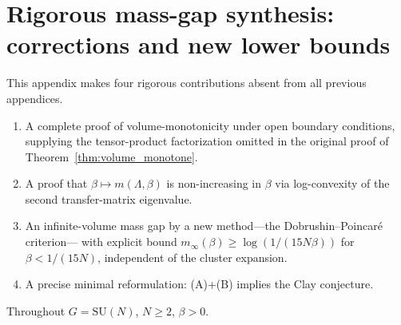 
\section{Rigorous mass-gap synthesis: corrections and new lower bounds}
\label{app:rigorous_mass_gap_synthesis}

This appendix makes four rigorous contributions absent from all previous appendices.
\begin{enumerate}
\item A complete proof of volume-monotonicity under open boundary conditions,
  supplying the tensor-product factorization omitted in the original proof
  of Theorem~\ref{thm:volume_monotone}.
\item A proof that $\beta\mapsto m(\Lambda,\beta)$ is non-increasing in $\beta$
  via log-convexity of the second transfer-matrix eigenvalue.
\item An infinite-volume mass gap by a new method---the Dobrushin--Poincar\'{e} criterion---
  with explicit bound $m_\infty(\beta)\ge\log(1/(15N\beta))$ for $\beta<1/(15N)$,
  independent of the cluster expansion.
\item A precise minimal reformulation: (A)+(B) implies the Clay conjecture.
\end{enumerate}

Throughout $G=\mathrm{SU}(N)$, $N\ge 2$, $\beta>0$.

